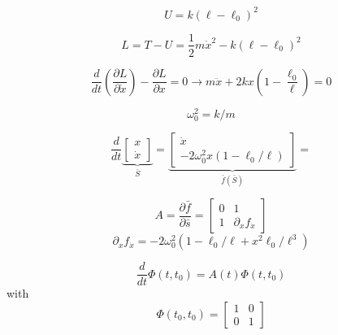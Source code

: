 \documentclass[10pt]{article}
\begin{document}
\begin{equation}
  U = k \left( \ell - \ell_0 \right)^2
\end{equation}

\begin{equation}
  L = T - U = \frac{1}{2} m \dot x ^2 - k \left( \ell - \ell_0 \right)^2
\end{equation}

\begin{equation}
  \frac{d}{dt} \left( \frac{\partial L}{\partial \dot x} \right) - \frac{\partial L}{\partial x} = 0 \rightarrow
  m \ddot x + 2 k x \left(1 - \frac{\ell_0}{\ell}\right) = 0
\end{equation}

\begin{equation}
  \omega_0^2 = k/m
\end{equation}

\begin{equation}
\frac{d}{dt} 
\underbrace{\left[ \begin{array}{c} x      \\ \dot x \end{array} \right]}_{\bar S}
  = 
\underbrace{\left[ \begin{array}{c} \dot x \\ - 2 \omega_0^2 x \left(1-\ell_0/\ell\right) \end{array} \right]}_{\bar f (\bar S)}
  =              
\end{equation}

\begin{equation}
  A   = \frac{\partial \bar f}{\partial \bar s}
      = \left[  \begin{array}{cc} 0 & 1 \\ 1 & \partial_x f_{\dot x} \end{array}\right]
\end{equation}
\begin{equation}
  \partial_x f_{\dot x} = -2 \omega_0^2 \left( 1-\ell_0/\ell +x^2 \ell_0/\ell^3 \right)
\end{equation}

\begin{equation}
  \frac{d}{dt} \Phi(t,t_0) = A(t) \Phi(t,t_0)
\end{equation}
with
\begin{equation}
  \Phi(t_0,t_0) = \left[ \begin{array}{cc} 1 & 0 \\ 0 & 1 \end{array} \right]
\end{equation}
\end{document}
